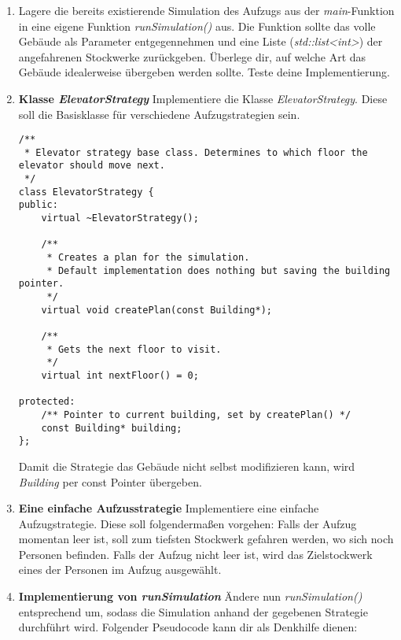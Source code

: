 \begin{enumerate}
\item
Lagere die bereits existierende Simulation des Aufzugs aus der \emph{main}-Funktion in eine eigene Funktion \emph{runSimulation()} aus. Die Funktion sollte das volle Gebäude als Parameter entgegennehmen und eine Liste (\emph{std::list<int>}) der angefahrenen Stockwerke zurückgeben. Überlege dir, auf welche Art das Gebäude idealerweise übergeben werden sollte.
Teste deine Implementierung.

\item \textbf{Klasse \emph{ElevatorStrategy}}
Implementiere die Klasse \emph{ElevatorStrategy}.
Diese soll die Basisklasse für verschiedene Aufzugstrategien sein.

\begin{lstlisting}
/**
 * Elevator strategy base class. Determines to which floor the elevator should move next.
 */
class ElevatorStrategy {
public:
	virtual ~ElevatorStrategy();

	/**
	 * Creates a plan for the simulation. 
	 * Default implementation does nothing but saving the building pointer.
	 */
	virtual void createPlan(const Building*);

	/** 
	 * Gets the next floor to visit.
	 */
	virtual int nextFloor() = 0;

protected:
	/** Pointer to current building, set by createPlan() */
	const Building* building;
};
\end{lstlisting}

Damit die Strategie das Gebäude nicht selbst modifizieren kann, wird \emph{Building} per const Pointer übergeben.

\item \textbf{Eine einfache Aufzusstrategie}
Implementiere eine einfache Aufzugstrategie.
Diese soll folgendermaßen vorgehen: 
Falls der Aufzug momentan leer ist, soll zum tiefsten Stockwerk gefahren werden, wo sich noch Personen befinden.
Falls der Aufzug nicht leer ist, wird das Zielstockwerk eines der Personen im Aufzug ausgewählt.

\item \textbf{Implementierung von \emph{runSimulation}}
Ändere nun \emph{runSimulation()} entsprechend um, sodass die Simulation anhand der gegebenen Strategie durchführt wird.
Folgender Pseudocode kann dir als Denkhilfe dienen: \\
\begin{algorithm}[H]
 \SetAlgoLined
\end{algorithm}
\end{enumerate}
